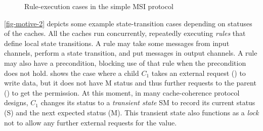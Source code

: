 \documentclass[sigplan,10pt,review,anonymous,screen]{acmart}\settopmatter{printfolios=true,printccs=false,printacmref=false}
\begin{document}
\begin{figure}[h]
  \centering
  \caption{Rule-execution cases in the simple MSI protocol}
  \vspace{-5pt}
  \label{fig-motive-2}
\end{figure}

\autoref{fig-motive-2} depicts some example state-transition cases depending on statuses of the caches.
All the caches run concurrently, repeatedly executing \emph{rules} that define local state transitions.
A rule may take some messages from input channels, perform a state transition, and put messages in output channels.
A rule may also have a precondition, blocking use of that rule when the precondition does not hold.
 shows the case where a child $C_1$ takes an external request () to write data, but it does not have M status and thus further requests to the parent () to get the permission.
At this moment, in many cache-coherence protocol designs, $C_1$ changes its status to a \emph{transient state} SM to record its current status (S) and the next expected status (M).
This transient state also functions as a \emph{lock} not to allow any further external requests for the value.
\end{document}
